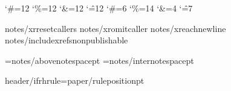 \catcode`\#=12 \catcode`\%=12 \catcode`\&=12 \catcode`\^=12
\catcode`\#=6 \catcode`\%=14 \catcode`\&=4 \catcode`\^=7
%

{notes/xrresetcallers}
{notes/xromitcaller}
{notes/xreachnewline}
{notes/includexrefs}\expandafter\def\csname x:properties\endcsname{{nonpublishable}}

\AboveNoteSpace={notes/abovenotespace}pt
\InterNoteSpace={notes/internotespace}pt

\def\HeaderPosition{{{paper/headerposition}}}
\def\FooterPosition{{{paper/footerposition}}}
{header/ifrhrule}\RHruleposition={paper/ruleposition}pt
\def\RangeSeparator{{\kern.1em\char"2013\kern.1em}} %
\def\ChapterVerseSeparator{{\kern.02em{header/chvseparator}\kern.02em}} %

\def\RHevenleft{{{header/evenleft}}}
\def\RHevencenter{{{header/evencenter}}}
\def\RHevenright{{{header/evenright}}}

\def\RHoddleft{{{header/oddleft}}}
\def\RHoddcenter{{{header/oddcenter}}}
\def\RHoddright{{{header/oddright}}}

\def\RHnoVevenleft{{{header/noVevenleft}}}
\def\RHnoVevencenter{{{header/noVevencenter}}}
\def\RHnoVevenright{{{header/noVevenright}}}

\def\RHnoVoddleft{{{header/noVoddleft}}}
\def\RHnoVoddcenter{{{header/noVoddcenter}}}
\def\RHnoVoddright{{{header/noVoddright}}}


\def\RFoddcenter{{{footer/oddcenter}}}
\def\RFevencenter{{{footer/oddcenter}}}
\def\RFtitlecenter{{{footer/oddcenter}}}
\def\RFnoVoddcenter{{{footer/oddcenter}}}
\def\RFnoVoddcenter{{{footer/oddcenter}}}
  
